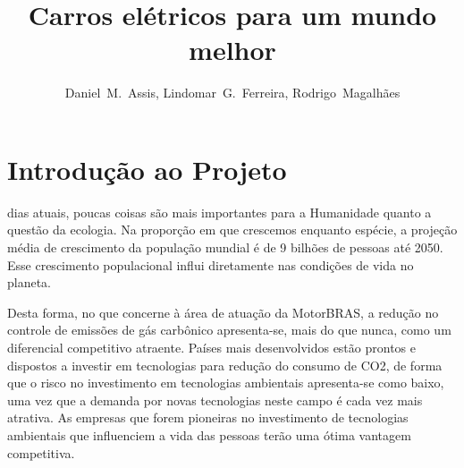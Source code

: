 \documentclass[12pt,journal,compsoc]{IEEEtran}
\begin{document}
\title{Carros elétricos para um mundo melhor}
\author{
  Daniel~M.~Assis, 
  Lindomar~G.~Ferreira, 
  Rodrigo~Magalhães
}


\maketitle

\IEEEdisplaynotcompsoctitleabstractindextext
\IEEEpeerreviewmaketitle


\section{Introdução ao Projeto}

 dias atuais, poucas coisas são mais importantes para a Humanidade quanto a questão da ecologia. Na proporção em que crescemos enquanto espécie, a projeção média de crescimento da população mundial é de 9 bilhões de pessoas até 2050. \cite{wwf_living_2013} Esse crescimento populacional influi diretamente nas condições de vida no planeta.

Desta forma, no que concerne à área de atuação da MotorBRAS, a redução no controle de emissões de gás carbônico apresenta-se, mais do que nunca, como um diferencial competitivo atraente. Países mais desenvolvidos estão prontos e dispostos a investir em tecnologias para redução do consumo de CO2, de forma que o risco no investimento em tecnologias ambientais apresenta-se como baixo, uma vez que a demanda por novas tecnologias neste campo é cada vez mais atrativa. As empresas que forem pioneiras no investimento de tecnologias ambientais que influenciem a vida das pessoas terão uma ótima vantagem competitiva. 
\end{document}

